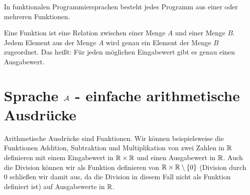 In funktionalen Programmiersprachen besteht jedes Programm aus einer oder mehreren
Funktionen.
\begin{defn}[Funktion]\label{defn:Funktion}
Eine Funktion ist eine Relation zwischen einer Menge $A$ und einer Menge $B$.
Jedem Element aus der Menge $A$ wird genau ein Element der Menge $B$ zugeordnet.
Das heißt: Für jeden möglichen Eingabewert gibt es genau einen Ausgabewert.
\end{defn}

\section{Sprache $\mathcal{A}$ - einfache arithmetische Ausdrücke}
Arithmetische Ausdrücke sind Funktionen. Wir können beispielsweise die Funktionen
Addition, Subtraktion und Multiplikation von zwei Zahlen in $\mathbb{R}$ definieren mit einem
Eingabewert in $\mathbb{R} \times \mathbb{R}$ und einen Ausgabewert in $\mathbb{R}$. Auch die Division
können wir als Funktion definieren von $\mathbb{R} \times \mathbb{R} \setminus \left\{0\right\}$ (Division durch $0$ schließen
wir damit aus, da die Division in diesem Fall nicht als Funktion definiert ist) auf Ausgabewerte in $\mathbb{R}$.


